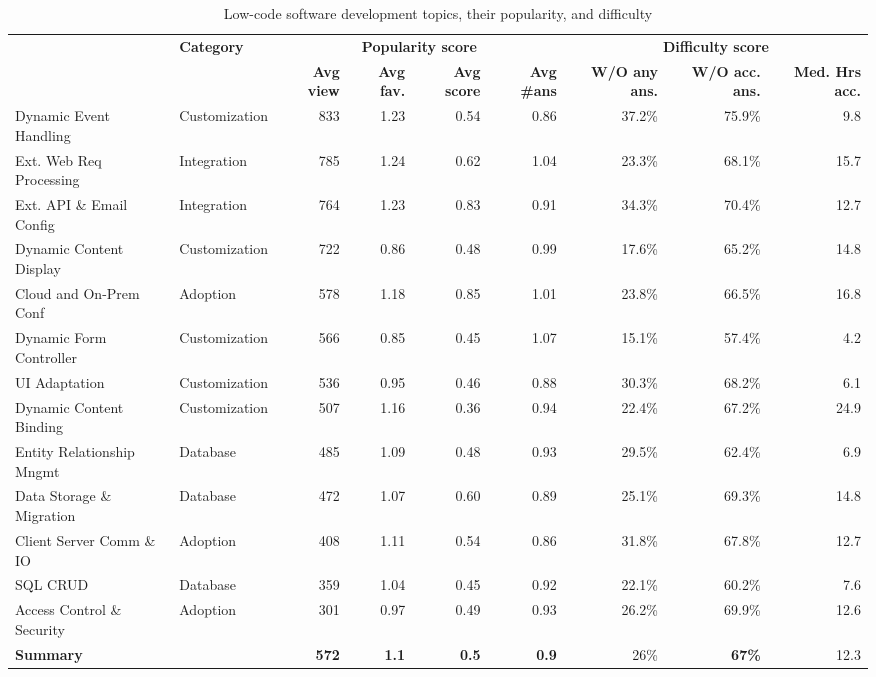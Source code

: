 \begin{table}[t]
  \centering
   \caption{Low-code software development topics, their popularity, and difficulty}
    \begin{tabular}{llrrrrrrr}
    \toprule{}
    \multirow{2}{*}{\textbf{Topic}} & \multirow{2}{*}{\textbf{Category}} & \multicolumn{4}{c}{\textbf{Popularity score}} & \multicolumn{3}{c}{\textbf{Difficulty score}} \\
    \cmidrule{3-9}
    {} & {}  & \textbf{Avg view} & \textbf{Avg fav.} & \textbf{Avg score} & \textbf{Avg \#ans} & \textbf{W/O any ans.} & \textbf{W/O acc. ans.} & \textbf{Med. Hrs acc.} \\
    \midrule

   Dynamic Event Handling	&	Customization &	833 &	1.23 &	0.54 & 0.86	& 37.2\% & 75.9\% &	9.8 \\
   Ext. Web Req Processing & Integration & 785 &	1.24 &	0.62 & 1.04	& 23.3\% &	68.1\% &	15.7 \\ 
   Ext. API \& Email Config &		Integration &	764 &	1.23 &	0.83 &	0.91 &	34.3\% & 70.4\% &	12.7 \\
   Dynamic Content Display &	Customization 	& 722 &	0.86 & 0.48 & 0.99 &	17.6\%	& 65.2\%	& 14.8 \\
   Cloud and On-Prem Conf	&	Adoption &	578 &	1.18 &	0.85 & 1.01 &	23.8\% &	66.5\% &	16.8 \\  
   Dynamic Form Controller	&	Customization  &	566 &	0.85 &	0.45 & 1.07	& 15.1\% &	57.4\% &	4.2 \\
    UI Adaptation	&	Customization  &	536 &	0.95 & 	0.46 & 0.88 &	30.3\%	& 68.2\% &	6.1 \\ 
    Dynamic Content Binding	&	Customization &	507 &	1.16 &	0.36 & 0.94	& 22.4\% &	67.2\% &	24.9 \\
   Entity Relationship Mngmt	&	Database &	485  &	1.09 &	0.48 &	0.93 &	29.5\% & 62.4\% &	6.9 \\  
    Data Storage \& Migration	&	Database &	472 &	1.07 &	0.60 & 0.89 &	25.1\% &	69.3\% &	14.8 \\
    Client Server Comm \& IO	&	Adoption &	408	& 1.11 &	0.54 & 0.86	& 31.8\% &	67.8\% &	12.7 \\ 
    SQL CRUD	&	Database	& 359 &	1.04 &	0.45 & 0.92 &	22.1\%  &	60.2\% &	7.6 \\
   Access Control \& Security	&	Adoption &	301 &	0.97 &	0.49 & 0.93 &	26.2\% & 69.9\% &	12.6 \\
    \midrule
    \multicolumn{2}{l}{\textbf{Summary}}  & \textbf{572} & \textbf{1.1} & \textbf{0.5} & \textbf{0.9} & 26\% &\textbf{67\%} & 12.3 \\
    \bottomrule
    \end{tabular}%
  \label{tab:topicPopularityDifficulty}%
\end{table}%

